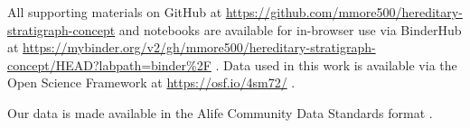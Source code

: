 All supporting materials on GitHub at \url{https://github.com/mmore500/hereditary-stratigraph-concept} and notebooks are available for in-browser use via BinderHub at \url{https://mybinder.org/v2/gh/mmore500/hereditary-stratigraph-concept/HEAD?labpath=binder%2F} \citep{ragan2018binder}.
Data used in this work is available via the Open Science Framework at
\url{https://osf.io/4sm72/} \citep{moreno2022hstratconceptsupplement} \citep{foster2017open}.

Our data is made available in the Alife Community Data Standards format \citep{lalejini2019data}.






